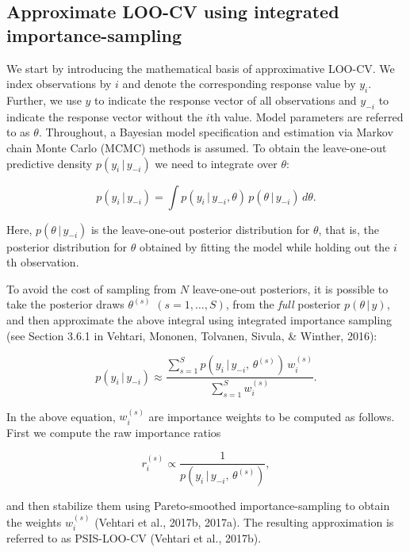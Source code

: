 \documentclass[english,,doc,floatsintext]{apa6}
\theoremstyle{definition}
\theoremstyle{definition}
\theoremstyle{definition}
\theoremstyle{remark}
\begin{document}
\hypertarget{approximate-loo-cv-using-integrated-importance-sampling}{%
\subsection{Approximate LOO-CV using integrated
importance-sampling}\label{approximate-loo-cv-using-integrated-importance-sampling}}

We start by introducing the mathematical basis of approximative LOO-CV.
We index observations by \(i\) and denote the corresponding response
value by \(y_i\). Further, we use \(y\) to indicate the response vector
of all observations and \(y_{-i}\) to indicate the response vector
without the \(i\)th value. Model parameters are referred to as
\(\theta\). Throughout, a Bayesian model specification and estimation
via Markov chain Monte Carlo (MCMC) methods is assumed. To obtain the
leave-one-out predictive density \(p(y_i \,|\, y_{-i})\) we need to
integrate over \(\theta\):

\begin{equation}
p(y_i\,|\,y_{-i}) =
  \int p(y_i\,|\, y_{-i}, \theta) \, p(\theta\,|\, y_{-i}) \,d \theta.
\end{equation}

Here, \(p(\theta\,|\, y_{-i})\) is the leave-one-out posterior
distribution for \(\theta\), that is, the posterior distribution for
\(\theta\) obtained by fitting the model while holding out the \(i\)th
observation.

To avoid the cost of sampling from \(N\) leave-one-out posteriors, it is
possible to take the posterior draws \(\theta^{(s)}\)
\((s=1,\ldots,S)\), from the \emph{full} posterior \(p(\theta\,|\, y)\),
and then approximate the above integral using integrated importance
sampling (see Section 3.6.1 in Vehtari, Mononen, Tolvanen, Sivula, \&
Winther, 2016):

\begin{equation}
 p(y_i\,|\, y_{-i}) \approx
   \frac{ \sum_{s=1}^S p(y_i\,|\,y_{-i},\,\theta^{(s)}) \,w_i^{(s)}}{ \sum_{s=1}^S w_i^{(s)}}.
\end{equation}

In the above equation, \(w_i^{(s)}\) are importance weights to be
computed as follows. First we compute the raw importance ratios

\begin{equation}
  r_i^{(s)} \propto \frac{1}{p(y_i \,|\, y_{-i}, \, \theta^{(s)})},
\end{equation}

and then stabilize them using Pareto-smoothed importance-sampling to
obtain the weights \(w_i^{(s)}\) (Vehtari et al., 2017b, 2017a). The
resulting approximation is referred to as PSIS-LOO-CV (Vehtari et al.,
2017b).
\end{document}
